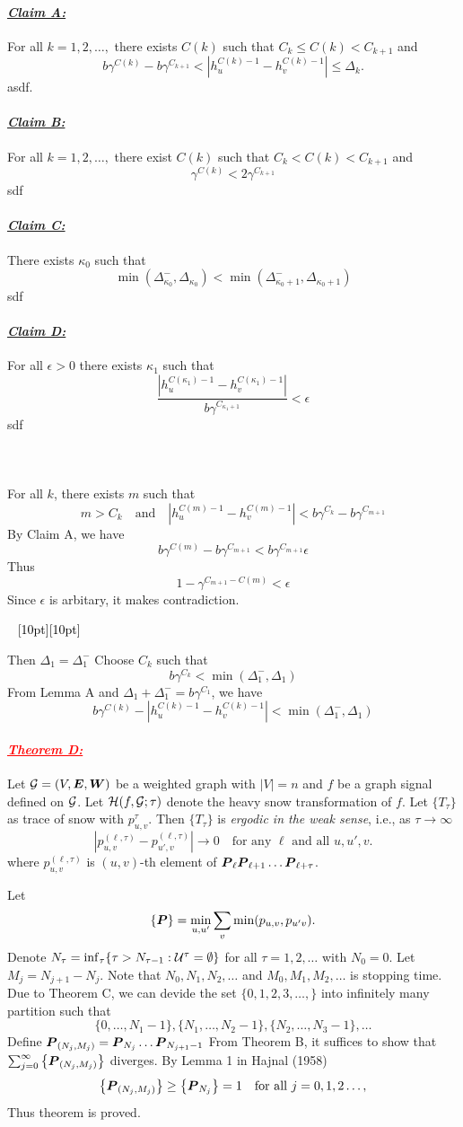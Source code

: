 \documentclass[12pt,oneside,english,a4paper]{article}
\newcommand{\dash}{\noindent \newline\textcolor{black}{\hrulefill~ \raisebox{-2.5pt}[10pt][10pt]{\leafright \decofourleft \decothreeleft  \aldineright \decotwo \floweroneleft \decoone   \floweroneright \decotwo \aldineleft\decothreeright \decofourright \leafleft} ~  \hrulefill}}
\def\bk{\paragraph{\LARGE$$}\LARGE}
\newcommand{\para}[1]{\paragraph{\LARGE\it\underline{\textbf{#1:}}}\LARGE}
\newcommand{\parared}[1]{\paragraph{\LARGE\textcolor{red}{\it\underline{\textbf{#1:}}}}\LARGE}
\newcommand{\bs}[1]{\mbox{\boldmath $#1$}}
\newcommand{\bsP}{\mbox{\boldmath $P$}}
\begin{document}
\para{Claim A} For all $k=1,2,\dots,$ there exists $C(k)$ such that $C_{k}\leq C(k) < C_{k+1}$ and 
\[
b\gamma^{C(k)}-b\gamma^{C_{k+1}}<\left|h_u^{C(k)-1}-h_v^{C(k)-1} \right|\leq \Delta_k.
\]
\proof asdf. 

\para{Claim B} For all $k=1,2,\dots,$ there exist $C(k)$ such that $C_k<C(k)<C_{k+1}$ and 
\[
\gamma^{C(k)}<2\gamma^{C_{k+1}}
\]
\proof sdf 

\para{Claim C} There exists $\kappa_0$ such that 
\[
\min(\Delta_{\kappa_0}^-,\Delta_{\kappa_0}) < \min(\Delta_{\kappa_0+1}^-,\Delta_{\kappa_0+1})
\]
\proof sdf

\para{Claim D} For all $\epsilon>0$ there exists $\kappa_1$ such that 
\[
\frac{\left|h_u^{C(\kappa_1)-1}-h_v^{C(\kappa_1)-1} \right|}{b\gamma^{C_{\kappa_1+1}}} <\epsilon
\]
\proof sdf

\bk For all $k$, there exists $m$ such that  
\[
m>C_k\quad\mbox{and}\quad \left|h_u^{C(m)-1}-h_v^{C(m)-1} \right|< b\gamma^{C_{k}}-b\gamma^{C_{m+1}}
\]
By Claim A, we have 
\[
b\gamma^{C(m)}-b\gamma^{C_{m+1}}<b\gamma^{C_{m+1}}\epsilon
\]
Thus 
\[
1-\gamma^{C_{m+1}-C(m)}<\epsilon
\]
Since $\epsilon$ is arbitary, it makes contradiction. 

\dash 

Then $\Delta_1=\Delta_1^-$ Choose $C_k$ such that 
\[
b\gamma^{C_{k}}<\min(\Delta_1^-,\Delta_1)
\]
From Lemma A and $\Delta_1+\Delta_1^-=b\gamma^{C_1}$, we have 
\[
b\gamma^{C(k)}-\left|h_u^{C(k)-1}-h_v^{C(k)-1} \right|<\min(\Delta_1^-,\Delta_1)
\]

\parared{Theorem D} Let ${\cal G}=(V,{\boldsymbol E},{\boldsymbol W})$ be a weighted graph with $|V|=n$ and $f$ be a graph signal defined on ${\cal G}$. Let ${\cal H}(f,{\cal G};\tau)$ denote the heavy snow transformation of $f$. 
Let $\{T_\tau\}$ as trace of snow with $p^{\tau}_{u,v}$. Then $\{T_{\tau}\}$ is \emph{ergodic in the weak sense}, i.e., as $\tau \to \infty$
\[
\left |p_{u,v}^{(\ell,\tau)}-p_{u',v}^{(\ell,\tau)}\right| \to 0 \quad \mbox{for any $\ell$ and all $u,u',v$.}
\]
where $p_{u,v}^{(\ell,\tau)}$ is $(u,v)$-th element of ${\bs P}_{\ell}{\bs P}_{\ell+1}\dots{\bs P}_{\ell+\tau}$.

\proof 
Let $$\{\bsP\}=\min_{u,u'}\sum_{v}\min(p_{u,v},p_{u'v}).$$%
Denote $N_{\tau}=\inf_\tau\{\tau>N_{\tau-1}: {\cal U}^{\tau}=\emptyset \}$ for all $\tau=1,2,\dots$ with $N_0=0$. Let $M_j=N_{j+1}-N_j$. Note that $N_0,N_1,N_2,\dots$ and $M_0,M_1,M_2,\dots$ is stopping time. Due to Theorem C, we can devide the set $\{0,1,2,3,\dots,\}$ into infinitely many partition such that 
\[
\{0,\dots,N_1-1\}, \{N_1,\dots,N_2-1\}, \{N_2,\dots,N_3-1\}, \dots
\]
Define $\bsP_{(N_j,M_j)}=\bsP_{N_j}\dots \bsP_{N_{j+1}-1}$ From Theorem B, it suffices to show that $\sum_{j=0}^{\infty}\left\{{\bsP}_{(N_j,M_j)} \right\}$
diverges. By Lemma 1 in Hajnal (1958)
\[
\left\{\bsP_{(N_j,M_j)}\right\}\geq\left\{\bsP
_{N_j}\right\}=1\quad \mbox{for all $j=0,1,2\dots,$}
\]
Thus theorem is proved.
\end{document}
